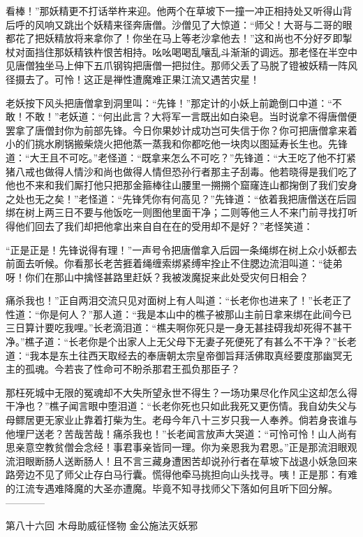 \documentclass[12pt,UTF8]{ctexbook}
\begin{document}
{	看棒！”那妖精更不打话举杵来迎。他两个在草坡下一撞一冲正相持处又听得山背后呼的风响又跳出个妖精来径奔唐僧。沙僧见了大惊道：“师父！大哥与二哥的眼都花了把妖精放将来拿你了！你坐在马上等老沙拿他去！”这和尚也不分好歹即掣杖对面挡住那妖精铁杵恨苦相持。吆吆喝喝乱嚷乱斗渐渐的调远。那老怪在半空中见唐僧独坐马上伸下五爪钢钩把唐僧一把挝住。那师父丢了马脱了镫被妖精一阵风径摄去了。可怜！这正是禅性遭魔难正果江流又遇苦灾星！
	
	老妖按下风头把唐僧拿到洞里叫：“先锋！”那定计的小妖上前跪倒口中道：“不敢！不敢！”老妖道：“何出此言？大将军一言既出如白染皂。当时说拿不得唐僧便罢拿了唐僧封你为前部先锋。今日你果妙计成功岂可失信于你？你可把唐僧拿来着小的们挑水刷锅搬柴烧火把他蒸一蒸我和你都吃他一块肉以图延寿长生也。先锋道：“大王且不可吃。”老怪道：“既拿来怎么不可吃？”先锋道：“大王吃了他不打紧猪八戒也做得人情沙和尚也做得人情但恐孙行者那主子刮毒。他若晓得是我们吃了他也不来和我们厮打他只把那金箍棒往山腰里一搠搠个窟窿连山都掬倒了我们安身之处也无之矣！”老怪道：“先锋凭你有何高见？”先锋道：“依着我把唐僧送在后园绑在树上两三日不要与他饭吃一则图他里面干净；二则等他三人不来门前寻找打听得他们回去了我们却把他拿出来自自在在的受用却不是好？”老怪笑道：
	
	“正是正是！先锋说得有理！”一声号令把唐僧拿入后园一条绳绑在树上众小妖都去前面去听候。你看那长老苦捱着绳缠索绑紧缚牢拴止不住腮边流泪叫道：“徒弟呀！你们在那山中擒怪甚路里赶妖？我被泼魔捉来此处受灾何日相会？
	
	痛杀我也！”正自两泪交流只见对面树上有人叫道：“长老你也进来了！”长老正了性道：“你是何人？”那人道：“我是本山中的樵子被那山主前日拿来绑在此间今已三日算计要吃我哩。”长老滴泪道：“樵夫啊你死只是一身无甚挂碍我却死得不甚干净。”樵子道：“长老你是个出家人上无父母下无妻子死便死了有甚么不干净？”长老道：“我本是东土往西天取经去的奉唐朝太宗皇帝御旨拜活佛取真经要度那幽冥无主的孤魂。今若丧了性命可不盼杀那君王孤负那臣子？
	
	那枉死城中无限的冤魂却不大失所望永世不得生？一场功果尽化作风尘这却怎么得干净也？”樵子闻言眼中堕泪道：“长老你死也只如此我死又更伤情。我自幼失父与母鳏居更无家业止靠着打柴为生。老母今年八十三岁只我一人奉养。倘若身丧谁与他埋尸送老？苦哉苦哉！痛杀我也！”长老闻言放声大哭道：“可怜可怜！山人尚有思亲意空教贫僧会念经！事君事亲皆同一理。你为亲恩我为君恩。”正是那流泪眼观流泪眼断肠人送断肠人！且不言三藏身遭困苦却说孙行者在草坡下战退小妖急回来路旁边不见了师父止存白马行囊。慌得他牵马挑担向山头找寻。咦！正是那：有难的江流专遇难降魔的大圣亦遭魔。毕竟不知寻找师父下落如何且听下回分解。
	------------
	
	第八十六回 木母助威征怪物 金公施法灭妖邪
	
}
\end{document}
